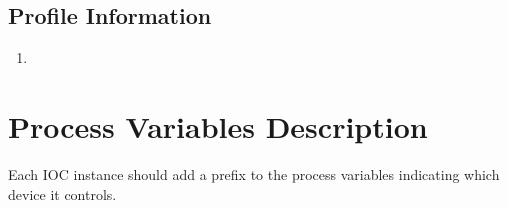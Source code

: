 \documentclass[openany]{article}
\begin{document}
    \subsection{Profile Information}\label{sec:profile-info}

        \begin{enumerate}
            \item \textbf{}
        \end{enumerate}

\newpage
\section{Process Variables Description}\label{sec:process-variables}

    Each IOC instance should add a prefix to the process variables indicating which device it controls.
\end{document}
